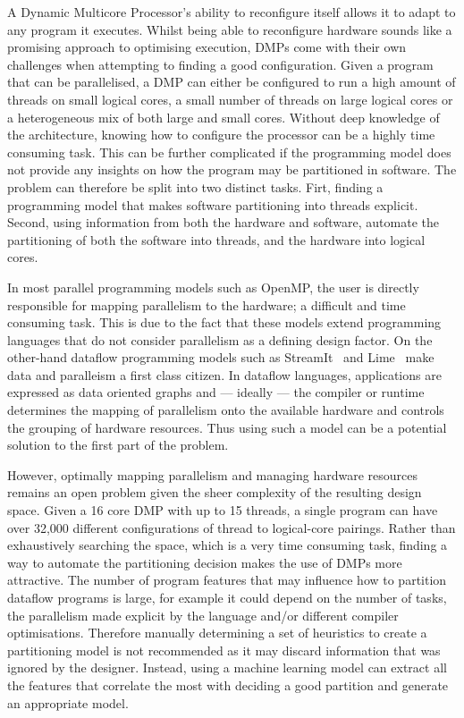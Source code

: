 A Dynamic Multicore Processor's ability to reconfigure itself allows it to adapt to any program it executes.
Whilst being able to reconfigure hardware sounds like a promising approach to optimising execution, DMPs come with their own challenges when attempting to finding a good configuration.
Given a program that can be parallelised, a DMP can either be configured to run a high amount of threads on small logical cores, a small number of threads on large logical cores or a heterogeneous mix of both large and small cores.
Without deep knowledge of the architecture, knowing how to configure the processor can be a highly time consuming task.
This can be further complicated if the programming model does not provide any insights on how the program may be partitioned in software.
The problem can therefore be split into two distinct tasks.
Firt, finding a programming model that makes software partitioning into threads explicit.
Second, using information from both the hardware and software, automate the partitioning of both the software into threads, and the hardware into logical cores.

In most parallel programming models such as OpenMP, the user is directly responsible for mapping parallelism to the hardware; a difficult and time consuming task.
This is due to the fact that these models extend programming languages that do not consider parallelism as a defining design factor.
On the other-hand dataflow programming models such as StreamIt~\cite{theis2002streamit} and Lime~\cite{auerbach2012lime} make data and paralleism a first class citizen.
In dataflow languages, applications are expressed as data oriented graphs and --- ideally --- the compiler or runtime determines the mapping of parallelism onto the available hardware and controls the grouping of hardware resources.
Thus using such a model can be a potential solution to the first part of the problem.

However, optimally mapping parallelism and managing hardware resources remains an open problem given the sheer complexity of the resulting design space.
Given a 16 core DMP with up to 15 threads, a single program can have over 32,000 different configurations of thread to logical-core pairings.
Rather than exhaustively searching the space, which is a very time consuming task, finding a way to automate the partitioning decision makes the use of DMPs more attractive.
The number of program features that may influence how to partition dataflow programs is large, for example it could depend on the number of tasks, the parallelism made explicit by the language and/or different compiler optimisations.
Therefore manually determining a set of heuristics to create a partitioning model is not recommended as it may discard information that was ignored by the designer.
Instead, using a machine learning model can extract all the features that correlate the most with deciding a good partition and generate an appropriate model.

